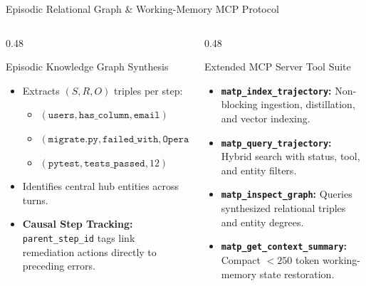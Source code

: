 \documentclass[aspectratio=169,10pt]{beamer}
\begin{document}
\begin{frame}{Episodic Relational Graph \& Working-Memory MCP Protocol}
  \begin{columns}[T,onlytextwidth]
    \begin{column}{0.48\textwidth}
      \begin{block}{Episodic Knowledge Graph Synthesis}
        \begin{itemize}
          \footnotesize
          \item Extracts $(S, R, O)$ triples per step:
            \begin{itemize}
              \scriptsize
              \item $(\texttt{users}, \texttt{has\_column}, \texttt{email})$
              \item $(\texttt{migrate.py}, \texttt{failed\_with}, \texttt{OperationalError})$
              \item $(\texttt{pytest}, \texttt{tests\_passed}, 12)$
            \end{itemize}
          \item Identifies central hub entities across turns.
          \item \textbf{Causal Step Tracking:} \texttt{parent\_step\_id} tags link remediation actions directly to preceding errors.
        \end{itemize}
      \end{block}
    \end{column}
    \begin{column}{0.48\textwidth}
      \begin{block}{Extended MCP Server Tool Suite}
        \begin{itemize}
          \footnotesize
          \item \textbf{\texttt{matp\_index\_trajectory}:} Non-blocking ingestion, distillation, and vector indexing.
          \item \textbf{\texttt{matp\_query\_trajectory}:} Hybrid search with status, tool, and entity filters.
          \item \textbf{\texttt{matp\_inspect\_graph}:} Queries synthesized relational triples and entity degrees.
          \item \textbf{\texttt{matp\_get\_context\_summary}:} Compact $<250$ token working-memory state restoration.
        \end{itemize}
      \end{block}
    \end{column}
  \end{columns}
\end{frame}
\end{document}
